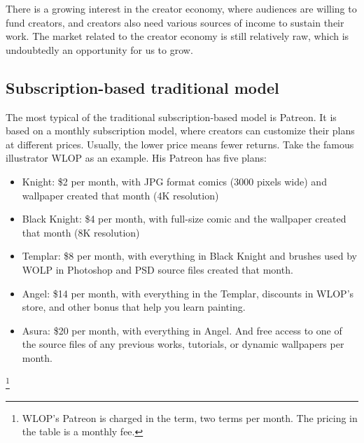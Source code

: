 \documentclass[12pt,a4paper]{article}
\begin{document}
    There is a growing interest in the creator economy, where audiences are
    willing to fund creators, and creators also need various sources of income
    to sustain their work.
    The market related to the creator economy is still relatively raw, which is
    undoubtedly an opportunity for us to grow.

    \subsection{Subscription-based traditional model}\label{subsec:tradition_patreon}

    The most typical of the traditional subscription-based model is Patreon.
    It is based on a monthly subscription model, where creators can customize
    their plans at different prices.
    Usually, the lower price means fewer returns.
    Take the famous illustrator WLOP as an example.
    His Patreon has five plans\cite{wlop_patreon}:
    \begin{itemize}
        \item Knight: \$2 per month, with JPG format comics (3000 pixels wide)
        and wallpaper created that month (4K resolution)
        \item Black Knight: \$4 per month, with full-size comic and the wallpaper
        created that month (8K resolution)
        \item Templar: \$8 per month, with everything in Black Knight and brushes
        used by WOLP in Photoshop and PSD source files created that month.
        \item Angel: \$14 per month, with everything in the Templar, discounts
        in WLOP's store, and other bonus that help you learn painting.
        \item Asura: \$20 per month, with everything in Angel. And free
        access to one of the source files of any previous works, tutorials, or
        dynamic wallpapers per month.
    \end{itemize}\footnote{
        WLOP's Patreon is charged in the term, two terms per month.
        The pricing in the table is a monthly fee.
    }
\end{document}

